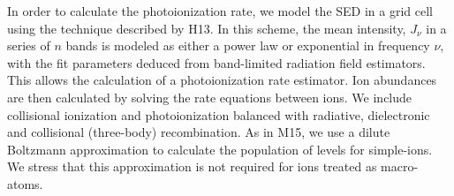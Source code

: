 \documentclass[useAMS,usenatbib]{mn2e_x}
\begin{document}
In order to calculate the photoionization rate, 
we model the SED in a grid cell using the technique described by H13. In this scheme,
the mean intensity, $J_{\nu}$ in a series of $n$ bands is modeled as either a power law or exponential
in frequency $\nu$, with the fit parameters deduced from band-limited radiation field estimators.
This allows the calculation of a photoionization rate estimator. Ion abundances are
then calculated by solving the rate equations between ions. We include collisional ionization
and photoionization balanced with radiative, 
dielectronic and collisional (three-body) recombination.
As in M15, we use a dilute Boltzmann approximation to calculate 
the population of levels for simple-ions. We stress that this approximation 
is not required for ions treated as macro-atoms. 
\end{document}
